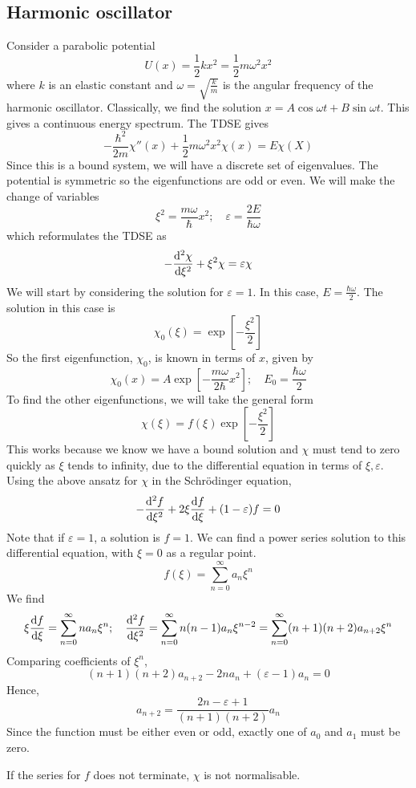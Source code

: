 \subsection{Harmonic oscillator}
Consider a parabolic potential
\[
	U(x) = \frac{1}{2} kx^2 = \frac{1}{2} m \omega^2 x^2
\]
where \( k \) is an elastic constant and \( \omega = \sqrt{\frac{k}{m}} \) is the angular frequency of the harmonic oscillator.
Classically, we find the solution \( x = A \cos \omega t + B \sin \omega t \).
This gives a continuous energy spectrum.
The TDSE gives
\[
	-\frac{\hbar^2}{2m} \chi''(x) + \frac{1}{2} m\omega^2 x^2 \chi(x) = E \chi(X)
\]
Since this is a bound system, we will have a discrete set of eigenvalues.
The potential is symmetric so the eigenfunctions are odd or even.
We will make the change of variables
\[
	\xi^2 = \frac{m\omega}{\hbar} x^2;\quad \varepsilon = \frac{2E}{\hbar \omega}
\]
which reformulates the TDSE as
\[
	-\dv[2]{\chi}{\xi} + \xi^2 \chi = \varepsilon \chi
\]
We will start by considering the solution for \( \varepsilon = 1 \).
In this case, \( E = \frac{\hbar \omega}{2} \).
The solution in this case is
\[
	\chi_0(\xi) = \exp[-\frac{\xi^2}{2}]
\]
So the first eigenfunction, \( \chi_0 \), is known in terms of \( x \), given by
\[
	\chi_0(x) = A \exp[-\frac{m\omega}{2\hbar}x^2];\quad E_0 = \frac{\hbar \omega}{2}
\]
To find the other eigenfunctions, we will take the general form
\[
	\chi(\xi) = f(\xi) \exp[-\frac{\xi^2}{2}]
\]
This works because we know we have a bound solution and \( \chi \) must tend to zero quickly as \( \xi \) tends to infinity, due to the differential equation in terms of \( \xi, \varepsilon \).
Using the above ansatz for \( \chi \) in the Schr\"odinger equation,
\[
	-\dv[2]{f}{\xi} + 2\xi \dv{f}{\xi} + (1-\varepsilon)f = 0
\]
Note that if \( \varepsilon = 1 \), a solution is \( f = 1 \).
We can find a power series solution to this differential equation, with \( \xi = 0 \) as a regular point.
\[
	f(\xi) = \sum_{n=0}^\infty a_n \xi^n
\]
We find
\[
	\xi \dv{f}{\xi} = \sum_{n=0}^\infty n a_n \xi^n;\quad \dv[2]{f}{\xi} = \sum_{n=0}^\infty n(n-1)a_n \xi^{n-2} = \sum_{n=0}^\infty (n+1)(n+2)a_{n+2}\xi^n
\]
Comparing coefficients of \( \xi^n \),
\[
	(n+1)(n+2) a_{n+2} - 2n a_n + (\varepsilon - 1) a_n = 0
\]
Hence,
\[
	a_{n+2} = \frac{2n - \varepsilon + 1}{(n+1)(n+2)} a_n
\]
Since the function must be either even or odd, exactly one of \( a_0 \) and \( a_1 \) must be zero.
\begin{proposition}
	If the series for \( f \) does not terminate, \( \chi \) is not normalisable.
\end{proposition}
